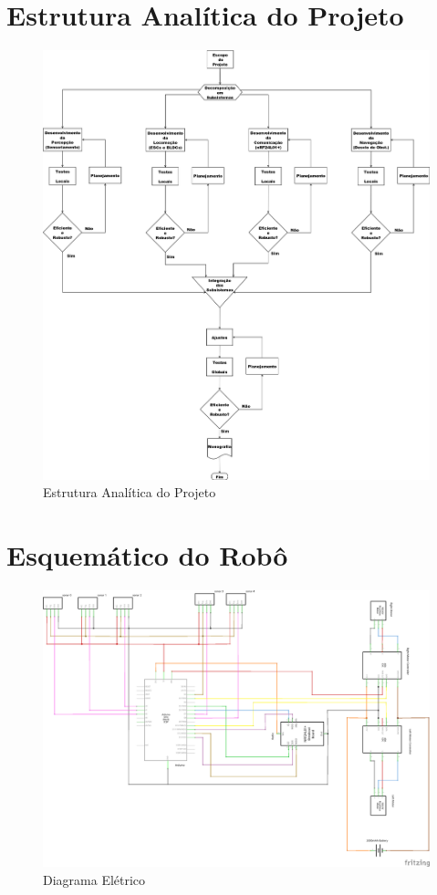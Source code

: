  \section{Estrutura Analítica do Projeto}
  \begin{figure}[H] %
    \centering
    \includegraphics[width=\linewidth]{../../Imagens/WBS.png}
    \caption{Estrutura Analítica do Projeto} %
    \label{WBS}
  \end{figure}
  
 \section{Esquemático do Robô}
  \begin{figure}[H]
    \centering
    \includegraphics[width=\linewidth]{../../Imagens/robot_schem.png}
    \caption{Diagrama Elétrico} %
    \label{fritzing}
  \end{figure}
  
